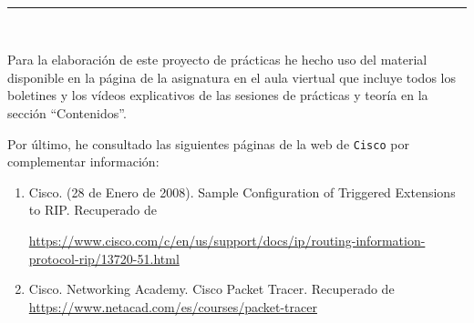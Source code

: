  \newpage
 \begin{center}
	{\fboxrule=4pt } \\
	\rule{15cm}{0pt} \\
\end{center}
\par Para la elaboración de este proyecto de prácticas he hecho uso del material disponible en la página de la asignatura en el aula viertual que incluye todos los boletines y los vídeos explicativos de las sesiones de prácticas y teoría en la sección ``Contenidos''.
\par Por último, he consultado las siguientes páginas de la web de \texttt{Cisco} por complementar información:
\begin{enumerate}
	\item Cisco. (28 de Enero de 2008). Sample Configuration of Triggered Extensions to RIP. Recuperado de 
	\raggedright\url{https://www.cisco.com/c/en/us/support/docs/ip/routing-information-protocol-rip/13720-51.html}
	\item Cisco. Networking Academy. Cisco Packet Tracer. Recuperado de 
	\url{https://www.netacad.com/es/courses/packet-tracer}
\end{enumerate}

